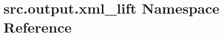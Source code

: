 \hypertarget{namespacesrc_1_1output_1_1xml__lift}{\section{src.\+output.\+xml\+\_\+lift Namespace Reference}
\label{namespacesrc_1_1output_1_1xml__lift}
}
